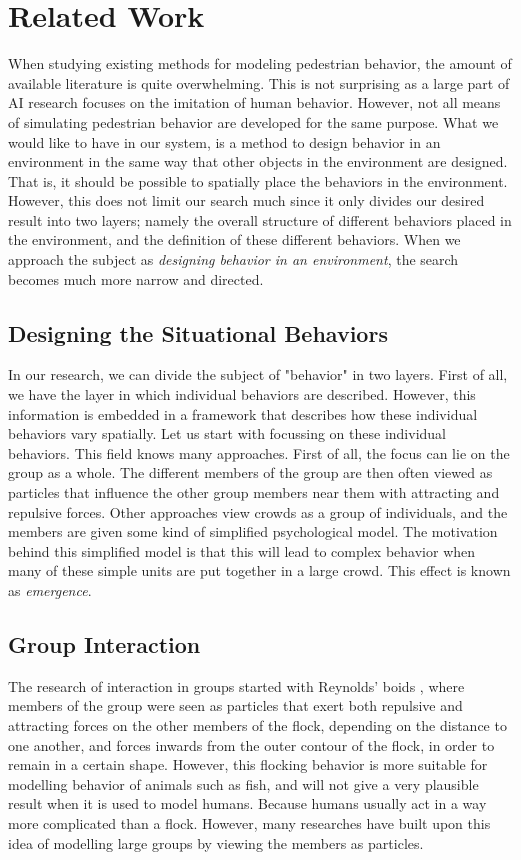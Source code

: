 \documentclass[11pt]{article}
\begin{document}
\section{Related Work}
When studying existing methods for modeling pedestrian behavior, the amount of available literature is quite overwhelming. This is not surprising as a large part of AI research focuses on the imitation of human behavior. However, not all means of simulating pedestrian behavior are developed for the same purpose. What we would like to have in our system, is a method to design behavior in an environment in the same way that other objects in the environment are designed. That is, it should be possible to spatially place the behaviors in the environment. However, this does not limit our search much since it only divides our desired result into two layers; namely the overall structure of different behaviors placed in the environment, and the definition of these different behaviors. When we approach the subject as \emph{designing behavior in an environment}, the search becomes much more narrow and directed.

\subsection{Designing the Situational Behaviors}
In our research, we can divide the subject of "behavior" in two layers.  First of all, we have the layer in which individual behaviors are described. However, this information is embedded in a framework that describes how these individual behaviors vary spatially. Let us start with focussing on these individual behaviors. This field knows many approaches. First of all, the focus can lie on the group as a whole. The different members of the group are then often viewed as particles that influence the other group members near them with attracting and repulsive forces. Other approaches view crowds as a group of individuals, and the members are given some kind of simplified psychological model. The motivation behind this simplified model is that this will lead to complex behavior when many of these simple units are put together in a large crowd. This effect is known as \emph{emergence}.\\

\subsection{Group Interaction}
The research of interaction in groups started with Reynolds' boids \cite{Reynolds87flocks} , where members of the group were seen as particles that exert both repulsive and attracting forces on the other members of the flock, depending on the distance to one another, and forces inwards from the outer contour of the flock, in order to remain in a certain shape.  However, this flocking behavior is more suitable for modelling behavior of animals such as fish, and will not give a very plausible result when it is used to model humans. Because humans usually act in a way more complicated than a flock. However, many researches have built upon this idea of modelling large groups by viewing the members as particles.
\end{document}
